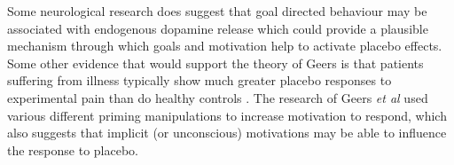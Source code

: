 Some neurological research does suggest that goal directed behaviour may be associated with endogenous dopamine release \cite{Scott2007a} which could provide a plausible mechanism through which  goals and motivation help to activate placebo effects. Some other evidence that would support the theory of Geers is that patients suffering from illness typically show much greater placebo responses to experimental pain than do healthy controls \cite{Klinger2007a}. The research of Geers \textit{et al } used various different priming manipulations to increase motivation to respond, which also suggests that implicit (or unconscious) motivations may be able to influence the response to placebo. 







